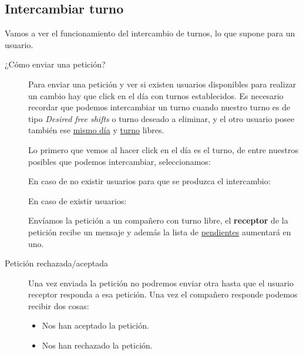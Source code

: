 \subsection{Intercambiar turno}
Vamos a ver el funcionamiento del intercambio de turnos, lo que supone para un usuario.


\begin{description}

\item[¿Cómo enviar una petición?] Para enviar una petición y ver si existen usuarios disponibles para realizar un cambio hay que click en el día con turnos establecidos. Es necesario recordar que podemos intercambiar un turno cuando nuestro turno es de tipo \emph{Desired free shifts} o turno deseado a eliminar, y el otro usuario posee también ese \underline{mismo día} y \underline{turno} libres.

Lo primero que vemos al hacer click en el día es el turno, de entre nuestros posibles que podemos intercambiar, seleccionamos:


En caso de no existir usuarios para que se produzca el intercambio:


En caso de existir usuarios:


Envíamos la petición a un compañero con turno libre, el \textbf{receptor} de la petición recibe un mensaje y además la lista de \underline{pendientes} aumentará en uno. 



\item[Petición rechazada/aceptada] Una vez enviada la petición no podremos enviar otra hasta que el usuario receptor responda a esa petición. Una vez el compañero responde podemos recibir dos cosas:

\begin{itemize}
\item Nos han aceptado la petición. 
\item Nos han rechazado la petición. 
 

\end{itemize}
\end{description}
